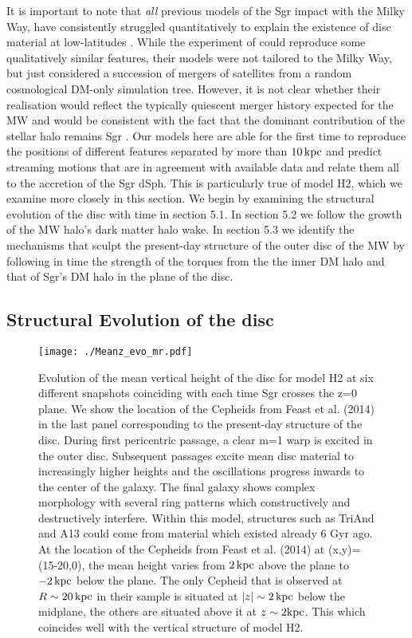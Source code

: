 \documentclass[useAMS,usenatbib]{mnras}
\begin{document}
It is important to note that {\it all} previous models of the Sgr impact with the Milky Way, have consistently struggled quantitatively to explain the existence of disc material at low-latitudes \citep{purcell11, gomez13,laporte16}. While the experiment of \cite{kazantzidis08} could reproduce some qualitatively similar features, their models were not tailored to the Milky Way, but just considered a succession of mergers of satellites from a random cosmological DM-only simulation tree. However, it is not clear whether their realisation would reflect the typically quiescent merger history expected for the MW \citep{ruchti15} and would be consistent with the fact that the dominant contribution of the stellar halo remains Sgr \citep{bell08}. Our models here are able for the first time to reproduce the positions of different features separated by more than $10 \,\rm{kpc}$ and predict streaming motions that are in agreement with available data and relate them all to the accretion of the Sgr dSph. This is particularly true of model H2, which we examine more closely in this section. We begin by examining the structural evolution of the disc with time in section 5.1. In section 5.2 we follow the growth of the MW halo's dark matter halo wake. In section 5.3 we identify the mechanisms that sculpt the present-day structure of the outer disc of the MW by following in time the strength of the torques from the the inner DM halo and that of Sgr's DM halo in the plane of the disc.

\subsection{Structural Evolution of the disc}

\begin{figure}
\texttt{[image: ./Meanz\_evo\_mr.pdf]}
\caption[]{ Evolution of the mean vertical height of the disc for model H2 at six different snapshots coinciding with each time Sgr crosses the z=0 plane. We show the location of the Cepheids from Feast et al. (2014) in the last panel corresponding to the present-day structure of the disc. During first pericentric passage, a clear m=1 warp is excited in the outer disc. Subsequent passages excite mean disc material to increasingly higher heights and the oscillations progress inwards to the center of the galaxy. The final galaxy shows complex morphology with several ring patterns which constructively and destructively interfere. Within this model, structures such as TriAnd and A13 could  come from material which existed already 6 Gyr ago. At the location of the Cepheids from Feast et al. (2014) at (x,y)=(15-20,0), the mean height varies from $2\,\rm{kpc}$ above the plane to $-2 \,\rm{kpc}$ below the plane. The only Cepheid that is observed at $R\sim20\,\rm{kpc}$ in their sample is situated at $|z|\sim2\,\rm{kpc}$ below the midplane, the others are situated above it at $z\sim 2\rm{kpc}$. This which coincides well with the vertical structure of model H2. }
\end{figure}
\end{document}

